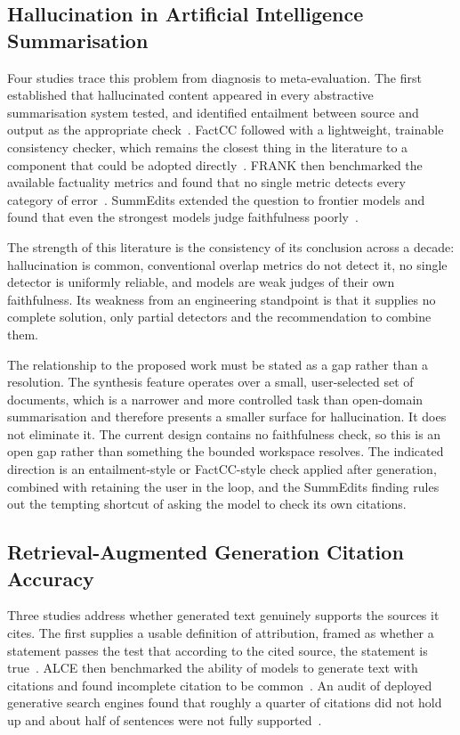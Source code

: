 \documentclass{FastFyp}
\begin{document}
\subsection{Hallucination in Artificial Intelligence Summarisation}
Four studies trace this problem from diagnosis to meta-evaluation. The first established that hallucinated content appeared in every abstractive summarisation system tested, and identified entailment between source and output as the appropriate check~\cite{ref:maynez2020}. FactCC followed with a lightweight, trainable consistency checker, which remains the closest thing in the literature to a component that could be adopted directly~\cite{ref:kryscinski2020}. FRANK then benchmarked the available factuality metrics and found that no single metric detects every category of error~\cite{ref:pagnoni2021}. SummEdits extended the question to frontier models and found that even the strongest models judge faithfulness poorly~\cite{ref:laban2023}.

The strength of this literature is the consistency of its conclusion across a decade: hallucination is common, conventional overlap metrics do not detect it, no single detector is uniformly reliable, and models are weak judges of their own faithfulness. Its weakness from an engineering standpoint is that it supplies no complete solution, only partial detectors and the recommendation to combine them.

The relationship to the proposed work must be stated as a gap rather than a resolution. The synthesis feature operates over a small, user-selected set of documents, which is a narrower and more controlled task than open-domain summarisation and therefore presents a smaller surface for hallucination. It does not eliminate it. The current design contains no faithfulness check, so this is an open gap rather than something the bounded workspace resolves. The indicated direction is an entailment-style or FactCC-style check applied after generation, combined with retaining the user in the loop, and the SummEdits finding rules out the tempting shortcut of asking the model to check its own citations.

\subsection{Retrieval-Augmented Generation Citation Accuracy}
Three studies address whether generated text genuinely supports the sources it cites. The first supplies a usable definition of attribution, framed as whether a statement passes the test that according to the cited source, the statement is true~\cite{ref:rashkin2023}. ALCE then benchmarked the ability of models to generate text with citations and found incomplete citation to be common~\cite{ref:gao2023}. An audit of deployed generative search engines found that roughly a quarter of citations did not hold up and about half of sentences were not fully supported~\cite{ref:liu2023}.
\end{document}
